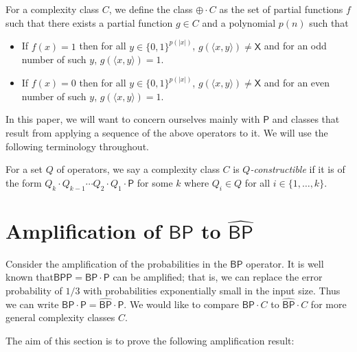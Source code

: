 \documentclass[11pt]{article}
\newcommand{\bp}{\textsf{BP}}
\newcommand{\strongbp}{\widehat{\textsf{BP}}}
\newcommand{\bpp}{\textsf{BPP}}
\newcommand{\parity}{\oplus}
\newcommand{\p}{\textsf{P}}
\newcommand{\x}{\textsf{X}}
\begin{document}
\begin{definition}\label{opparity}
For a complexity class $C$, we define the class $\parity\cdot C$ as the set of partial functions $f$ such that there exists a partial function $g \in C$ and a polynomial $p(n)$ such that
\begin{itemize}
\item If $f(x) = 1$ then for all $y \in \{0,1\}^{p(|x|)}$, $g(\langle x, y\rangle) \neq \x$ and for an odd number of such $y$, $g(\langle x,y\rangle) = 1$.
\item If $f(x) = 0$ then for all $y \in \{0,1\}^{p(|x|)}$, $g(\langle x, y\rangle) \neq \x$ and for an even number of such $y$, $g(\langle x,y\rangle) = 1$.
\end{itemize}
\end{definition}

In this paper, we will want to concern ourselves mainly with $\p$ and classes that result from applying a sequence of the above operators to it. We will use the following terminology throughout.
\begin{definition}\label{constructible}
For a set $Q$ of operators, we say a complexity class $C$ is \emph{$Q$-constructible} if it is of the form $Q_k \cdot Q_{k-1} \cdots Q_{2} \cdot Q_1 \cdot \p$ for some $k$ where $Q_i \in Q$ for all $i \in \{1,\ldots,k\}$.
\end{definition}

\section{Amplification of $\bp$ to $\strongbp$\label{amplifysection}}

Consider the amplification of the probabilities in the $\bp$ operator. It is well known that\linebreak $\bpp = \bp \cdot \p$ can be amplified; that is, we can replace the error probability of $1/3$ with probabilities exponentially small in the input size. Thus we can write $\bp \cdot \p = \strongbp \cdot \p$. We would like to compare $\bp \cdot C$ to $\strongbp \cdot C$ for more general complexity classes $C$.

The aim of this section is to prove the following amplification result:
\end{document}
